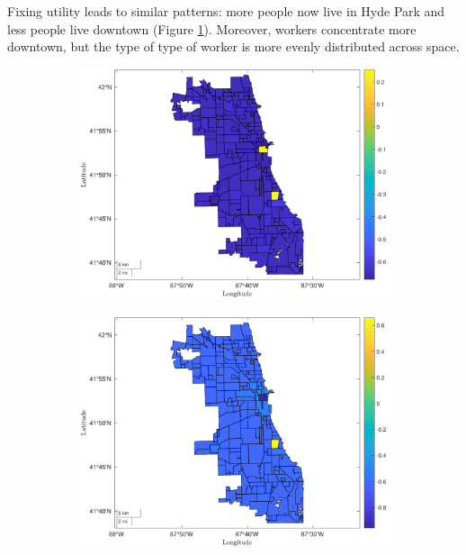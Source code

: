 \documentclass[12pt]{article}
\begin{document}
\clearpage
Fixing utility leads to similar patterns: more people now live in Hyde Park and less people live downtown (Figure \ref{fig:ut_house_res}). Moreover, workers concentrate more downtown, but the type of type of worker is more evenly distributed across space. 
\begin{figure}[h!]
\centering
    \caption{Home Prices and Residents}
    \begin{subfigure}{0.75\textwidth}
         \centering
         \includegraphics[width=\textwidth]{Pset1/Figures/Single Agent/Counterfactual/Fix utility/housing.pdf}
    \end{subfigure}  
    \begin{subfigure}{0.75\textwidth}
         \centering
         \includegraphics[width=\linewidth]{Pset1/Figures/Single Agent/Counterfactual/Fix utility/residents.pdf}
    \end{subfigure}
    \label{fig:ut_house_res}
\end{figure}
\end{document}
